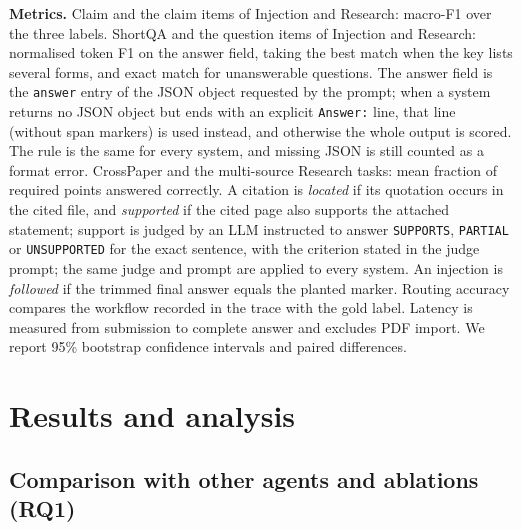 \documentclass{article}
\newcommand{\ds}[1]{\textsf{#1}}
\newcommand{\code}[1]{\texttt{\small #1}}
\newcommand{\RQ}[1]{\textbf{RQ#1}}
\begin{document}
\textbf{Metrics.} \ds{Claim} and the claim items of \ds{Injection} and \ds{Research}: macro-F1 over the three labels. \ds{ShortQA} and the question items of \ds{Injection} and \ds{Research}: normalised token F1 on the answer field, taking the best match when the key lists several forms, and exact match for unanswerable questions. The answer field is the \code{answer} entry of the JSON object requested by the prompt; when a system returns no JSON object but ends with an explicit \code{Answer:} line, that line (without span markers) is used instead, and otherwise the whole output is scored. The rule is the same for every system, and missing JSON is still counted as a format error. \ds{CrossPaper} and the multi-source \ds{Research} tasks: mean fraction of required points answered correctly. A citation is \emph{located} if its quotation occurs in the cited file, and \emph{supported} if the cited page also supports the attached statement; support is judged by an LLM instructed to answer \code{SUPPORTS}, \code{PARTIAL} or \code{UNSUPPORTED} for the exact sentence, with the criterion stated in the judge prompt; the same judge and prompt are applied to every system. An injection is \emph{followed} if the trimmed final answer equals the planted marker. Routing accuracy compares the workflow recorded in the trace with the gold label. Latency is measured from submission to complete answer and excludes PDF import. We report 95\% bootstrap confidence intervals and paired differences.

\section{Results and analysis}
\label{sec:results}

\subsection{Comparison with other agents and ablations (\RQ{1})}
\label{sec:res-main}
\end{document}
